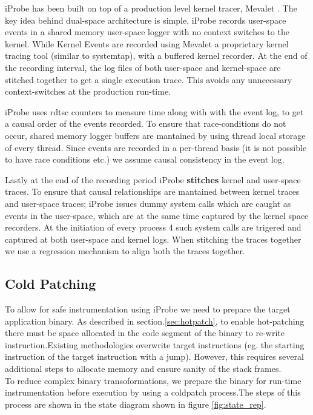 iProbe has been built on top of a production level kernel tracer, Mevalet \cite{mevalet}. The key idea behind dual-space architecture is simple, iProbe records user-space events in a shared memory user-space logger with no context switches to the kernel. While Kernel Events are recorded using Mevalet a proprietary kernel tracing tool (similar to systemtap\cite{systemtap}), with a buffered kernel recorder. At the end of the recording interval, the log files of both user-space and kernel-space are stitched together to get a single execution trace. This avoids any unnecessary context-switches at the production run-time.

iProbe uses rdtsc counters\cite{rdtsc} to measure time along with with the event log, to get a causal order of the events recorded. To ensure that race-conditions do not occur, shared memory logger buffers are mantained by using thread local storage\cite{tls} of every thread. Since events are recorded in a per-thread basis (it is not possible to have race conditions etc.) we assume causal consistency in the event log.  

Lastly at the end of the recording period iProbe \textbf{stitches} kernel and user-space traces. To ensure that causal relationships are mantained between kernel traces and user-space traces; iProbe issues dummy system calls which are caught as events in the user-space, which are at the same time captured by the kernel space recorders.  At the initiation of every process 4 such system calls are trigered and captured at both user-space and kernel logs. When stitching the traces together we use a regression mechanism to align both the traces together.


\subsection{Cold Patching}
\label{sec:coldpatch}



To allow for safe instrumentation using iProbe we need to prepare the target application binary. As described in section.\ref{sec:hotpatch}, to enable hot-patching there must be space allocated in the code segment of the binary to re-write instruction.Existing methodologies overwrite target instructions (eg. the starting instruction of the target instruction with a 
jump). However, this requires several additional steps to allocate memory and ensure sanity of the stack frames. 
\\
\indent To reduce complex binary transoformations, we prepare the binary for run-time instrumentation before execution by using a coldpatch process.The steps of this process are shown in the state diagram shown in figure \ref{fig:state_rep}. 

